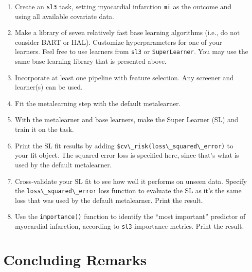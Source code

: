 \documentclass[
  12pt, krantz2,
]{krantz}
\newcommand{\passthrough}[1]{#1}
\providecommand{\tightlist}{%
  \setlength{\itemsep}{0pt}\setlength{\parskip}{0pt}}
\theoremstyle{definition}
\theoremstyle{definition}
\theoremstyle{definition}
\newcommand{\1}{\mathbbm{1}}
\begin{document}
\begin{enumerate}
\def\labelenumi{\arabic{enumi}.}
\tightlist
\item
  Create an \passthrough{\lstinline!sl3!} task, setting myocardial infarction \passthrough{\lstinline!mi!} as the outcome and
  using all available covariate data.
\item
  Make a library of seven relatively fast base learning algorithms (i.e., do
  not consider BART or HAL). Customize hyperparameters for one of your
  learners. Feel free to use learners from \passthrough{\lstinline!sl3!} or \passthrough{\lstinline!SuperLearner!}. You may
  use the same base learning library that is presented above.
\item
  Incorporate at least one pipeline with feature selection. Any screener and
  learner(s) can be used.
\item
  Fit the metalearning step with the default metalearner.
\item
  With the metalearner and base learners, make the Super Learner (SL) and
  train it on the task.
\item
  Print the SL fit results by adding \passthrough{\lstinline!$cv\_risk(loss\_squared\_error)!} to your
  fit object. The squared error loss is specified here, since that's what is
  used by the default metalearner.
\item
  Cross-validate your SL fit to see how well it performs on unseen data.
  Specify the \passthrough{\lstinline!loss\_squared\_error!} loss function to evaluate the SL as it's
  the same loss that was used by the default metalearner. Print the result.
\item
  Use the \passthrough{\lstinline!importance()!} function to identify the ``most important'' predictor of
  myocardial infarction, according to \passthrough{\lstinline!sl3!} importance metrics. Print the
  result.
\end{enumerate}

\hypertarget{concluding-remarks}{%
\section{Concluding Remarks}\label{concluding-remarks}}
\end{document}
